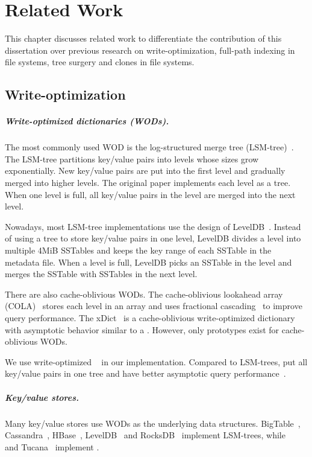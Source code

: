 \chapter{Related Work}
\label{chap:related}

This chapter discusses related work to differentiate the contribution of
this dissertation
over previous research on write-optimization, full-path indexing in file
systems, tree surgery and clones in file systems.

\section{Write-optimization}

\paragraph{Write-optimized dictionaries (WODs).}
The most commonly used WOD is the
log-structured merge tree (LSM-tree)~\cite{lsm}.
The LSM-tree partitions key/value pairs into levels whose sizes
grow exponentially.
New key/value pairs are put into the first level and gradually merged
into higher levels.
The original paper implements each level as a tree.
When one level is full, all key/value pairs in the level are merged into the
next level.

Nowadays, most LSM-tree implementations use the design of
LevelDB~\cite{leveldb}.
Instead of using a tree to store key/value pairs in one level,
LevelDB divides a level into multiple 4MiB SSTables and
keeps the key range of each SSTable in the metadata file.
When a level is full, LevelDB picks an SSTable in the level and merges the
SSTable with SSTables in the next level.

There are also cache-oblivious WODs.
The cache-oblivious lookahead array (COLA)~\citep{cola} stores
each level in an array
and  uses fractional cascading~\citep{fcascading} to improve query performance.
The xDict~\citep{xdict} is a cache-oblivious write-optimized dictionary with
asymptotic behavior similar to a \bet.
However, only prototypes exist for cache-oblivious WODs.

We use write-optimized \bets~\cite{bet} in our implementation.
Compared to LSM-trees, \bets put all key/value pairs in one tree and have
better asymptotic query performance~\cite{betlogin}.

\paragraph{Key/value stores.}
Many key/value stores use WODs as the underlying data structures.
BigTable~\citep{bigtable}, Cassandra~\citep{cassandra}, HBase~\citep{hbase},
LevelDB~\citep{leveldb} and RocksDB~\citep{rocksdb} implement LSM-trees,
while \fti~\cite{fti} and Tucana~\cite{tucana} implement \bets.

